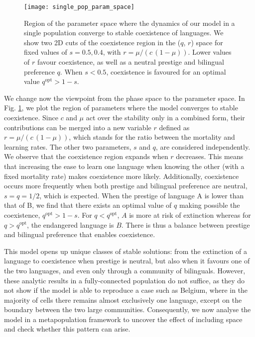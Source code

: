 \documentclass[../thesis.tex]{subfiles}
\begin{document}
\begin{figure}[h]
\centering
    \texttt{[image: single\_pop\_param\_space]}
    \caption{Region of the parameter space where the dynamics of our model in a single
    population converge to stable coexistence of languages. We show two 2D cuts of the
    coexistence region in the ($q$, $r$) space for fixed values of $s=0.5, 0.4$, with $r
    = \mu / (c \, (1-\mu))$. Lower values of $r$ favour coexistence, as well as a neutral
    prestige and bilingual preference $q$. When $s < 0.5$, coexistence is favoured for an
    optimal value $q^\text{opt} > 1-s$.}
    \label{fig:coex_region}
\end{figure}

We change now the viewpoint from the phase space to the parameter space. In Fig.
\ref{fig:coex_region}, we plot the region of parameters where the model converges to
stable coexistence. Since $c$ and $\mu$ act over the stability only in a combined form,
their contributions can be merged into a new variable $r$ defined as $r = \mu/(c \,
(1-\mu))$, which stands for the ratio between the mortality and learning rates. The
other two parameters, $s$ and $q$, are considered independently. We observe that the
coexistence region expands when $r$ decreases. This means that increasing the ease to
learn one language when knowing the other (with a fixed mortality rate) makes
coexistence more likely. Additionally, coexistence occurs more frequently when both
prestige and bilingual preference are neutral, $s = q = 1/2$, which is expected. When
the prestige of language A is lower than that of B, we find that there exists an optimal
value of $q$ making possible the coexistence, $q^\text{opt} > 1-s$. For $q <
q^\text{opt}$, $A$ is more at risk of extinction whereas for $q > q^\text{opt}$, the
endangered language is $B$. There is thus a balance between prestige and bilingual
preference that enables coexistence. 

This model opens up unique classes of stable solutions: from the extinction of a
language to coexistence when prestige is neutral, but also when it favours one of the two
languages, and even only through a community of bilinguals. However, these analytic
results in a fully-connected population do not suffice, as they do not show if the model
is able to reproduce a case such as Belgium, where in the majority of cells there
remains almost exclusively one language, except on the boundary between the two large
communities. Consequently, we now analyse the model in a metapopulation framework to
uncover the effect of including space and check whether this pattern can arise.
\end{document}
